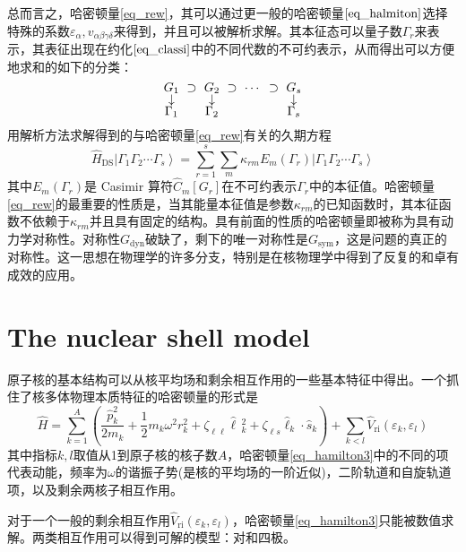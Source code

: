 总而言之，哈密顿量\ref{eq_rew}，其可以通过更一般的哈密顿量$\ref{eq_halmiton}$选择特殊的系数$\varepsilon_\alpha,v_{\alpha\beta\gamma\delta}$来得到，并且可以被解析求解。其本征态可以量子数$\Gamma_r$来表示，其表征出现在约化$\ref{eq_classi}$中的不同代数的不可约表示，从而得出可以方便地求和的如下的分类：
\begin{equation*}
{\setlength\arraycolsep{3pt}\renewcommand{\arraystretch}{0.7}
\begin{array}{ccccccc}
G_1&\supset&G_2&\supset&\cdots&\supset&G_s\\
\downarrow& &\downarrow& & & &\downarrow\\
\Gamma_1& &\Gamma_2& & & &\Gamma_s
\end{array}}
\end{equation*}
用解析方法求解得到的与哈密顿量\ref{eq_rew}有关的久期方程
\begin{equation*}
\widehat{H}_\textrm{DS}\left|\Gamma_1\Gamma_2\cdots\Gamma_s\right>=\sum_{r=1}^s\sum_m\kappa_{rm}E_m(\Gamma_r)\left|\Gamma_1\Gamma_2\cdots\Gamma_s\right>
\end{equation*}
其中$E_m(\Gamma_r)$是 Casimir 算符$\widehat{C}_m[G_r]$在不可约表示$\Gamma_r$中的本征值。哈密顿量\ref{eq_rew}的最重要的性质是，当其能量本征值是参数$\kappa_{rm}$的已知函数时，其本征函数不依赖于$\kappa_{rm}$并且具有固定的结构。具有前面的性质的哈密顿量即被称为具有动力学对称性。对称性$G_\textrm{dyn}$破缺了，剩下的唯一对称性是$G_\textrm{sym}$，这是问题的真正的对称性。这一思想在物理学的许多分支，特别是在核物理学中得到了反复的和卓有成效的应用。
\section{The nuclear shell model}
原子核的基本结构可以从核平均场和剩余相互作用的一些基本特征中得出。一个抓住了核多体物理本质特征的哈密顿量的形式是
\begin{equation}\label{eq_hamilton3}
\widehat{H}=\sum_{k=1}^A\left(\frac{\widehat{p}_k^2}{2m_k}+\frac{1}{2}m_k\omega^2r_k^2+\zeta_{\ell\ell}\widehat{\ell}\,_k^2+\zeta_{\ell s}\widehat{\ell}_k\cdot\widehat{s}_k\right)+\sum_{k<l}\widehat{V}_\textrm{ri}(\varepsilon_k,\varepsilon_l)
\end{equation}
其中指标$k,l$取值从1到原子核的核子数$A$，哈密顿量\ref{eq_hamilton3}中的不同的项代表动能，频率为$\omega$的谐振子势(是核的平均场的一阶近似)，二阶轨道和自旋轨道项，以及剩余两核子相互作用。

对于一个一般的剩余相互作用$\widehat{V}_\textrm{ri}(\varepsilon_k,\varepsilon_l)$，哈密顿量\ref{eq_hamilton3}只能被数值求解。两类相互作用可以得到可解的模型：对和四极。
